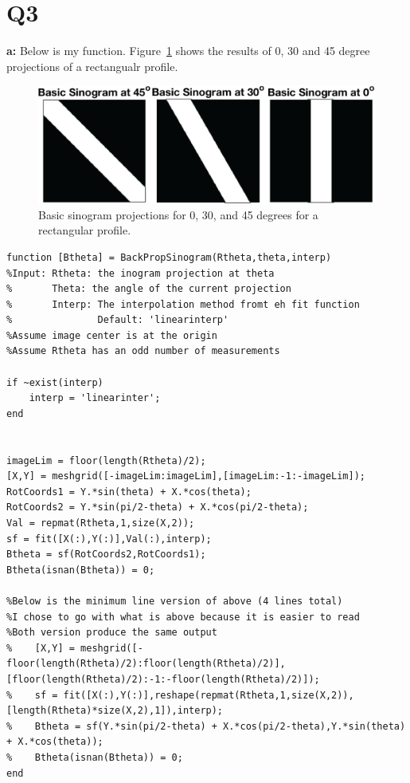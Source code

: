 \documentclass[12pt]{article}
\begin{document}
\section{Q3}
\noindent\textbf{a: }
Below is my function. Figure~\ref{basic} shows the results of 0, 30 and 45 degree projections of a rectangualr profile.

\begin{figure}[H]
	
	\includegraphics[width=\textwidth]{basicone.png}
	\caption{Basic sinogram projections for 0, 30, and 45 degrees for a rectangular profile.}
	\label{basic}
\end{figure}
\begin{lstlisting}[style=Matlab-editor]
function [Btheta] = BackPropSinogram(Rtheta,theta,interp)
%Input: Rtheta: the inogram projection at theta
%       Theta: the angle of the current projection
%       Interp: The interpolation method fromt eh fit function
%               Default: 'linearinterp'
%Assume image center is at the origin
%Assume Rtheta has an odd number of measurements

if ~exist(interp)
	interp = 'linearinter';
end


imageLim = floor(length(Rtheta)/2);
[X,Y] = meshgrid([-imageLim:imageLim],[imageLim:-1:-imageLim]);
RotCoords1 = Y.*sin(theta) + X.*cos(theta);
RotCoords2 = Y.*sin(pi/2-theta) + X.*cos(pi/2-theta);
Val = repmat(Rtheta,1,size(X,2));
sf = fit([X(:),Y(:)],Val(:),interp);
Btheta = sf(RotCoords2,RotCoords1);
Btheta(isnan(Btheta)) = 0;

%Below is the minimum line version of above (4 lines total)
%I chose to go with what is above because it is easier to read
%Both version produce the same output
%    [X,Y] = meshgrid([-floor(length(Rtheta)/2):floor(length(Rtheta)/2)],[floor(length(Rtheta)/2):-1:-floor(length(Rtheta)/2)]);
%    sf = fit([X(:),Y(:)],reshape(repmat(Rtheta,1,size(X,2)),[length(Rtheta)*size(X,2),1]),interp);
%    Btheta = sf(Y.*sin(pi/2-theta) + X.*cos(pi/2-theta),Y.*sin(theta) + X.*cos(theta));
%    Btheta(isnan(Btheta)) = 0;
end
\end{lstlisting}
\end{document}
